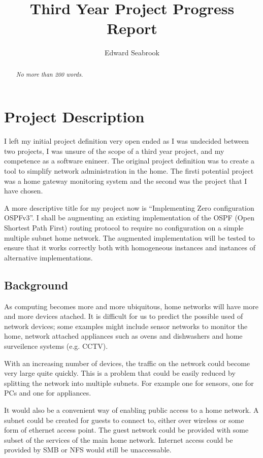 \documentclass[12pt]{report}
\author{Edward Seabrook}
\title{Third Year Project Progress Report}
\begin{document}



\begin{abstract}
\em No more than 200 words. \em


\end{abstract}

\tableofcontents
\clearpage
\listoftodos

\chapter{Project Description}

I left my initial project definition very open ended as I was undecided between
two projects, I was unsure of the scope of a third year project, and my
competence as a software enineer. The original project definition was to create
a tool to simplify network administration in the home. The firsti potential
project was a home gateway monitoring system and the second was the project that
I have chosen. 

A more descriptive title for my project now is ``Implementing Zero configuration
OSPFv3''. I shall be augmenting an existing implementation of the OSPF (Open
Shortest Path First) routing protocol to require no configuration on a simple
multiple subnet home network. The augmented implementation will be tested to
ensure that it works correctly both with homogeneous instances and instances of
alternative implementations. 

\section{Background}
As computing becomes more and more ubiquitous, home networks will have more and
more devices atached. It is difficult for us to predict the possible used of
network devices; some examples might include sensor networks to monitor the
home, network attached appliances such as ovens and dishwashers and home
surveilence systems (e.g. CCTV). 

With an increasing number of devices, the traffic on the network could become
very large quite quickly. This is a problem that could be easily reduced by
splitting the network into multiple subnets. For example one for sensors, one
for PCs and one for appliances. 

It would also be a convenient way of enabling public access to a home
network. A subnet could be created for guests to connect to, either over
wireless or some form of ethernet access point. The guest network could be
provided with some subset of the services of the main home network. Internet
access could be provided by SMB or NFS would still be unaccessable.
\end{document}
